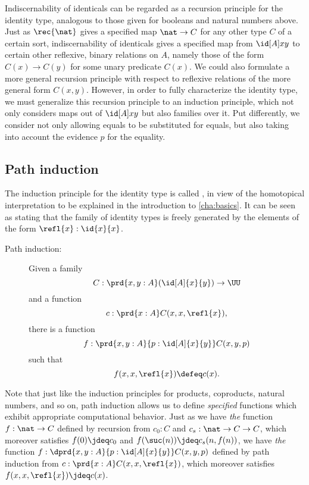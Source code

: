 Indiscernability of identicals can be regarded as a recursion principle for the identity type, analogous to those given for booleans and natural numbers above.
Just as $\rec{\nat}$ gives a specified map $\nat\to C$ for any other type $C$ of a certain sort, indiscernability of identicals gives a specified map from $\id[A] x y$ to certain other reflexive, binary relations on $A$, namely those of the form $C(x) \to C(y)$ for some unary predicate $C(x)$.
We could also formulate a more general recursion principle with respect to reflexive relations of the more general form $C(x,y)$.
However, in order to fully characterize the identity type, we must generalize this recursion principle to an induction principle, which not only considers maps out of $\id[A] x y$ but also families over it.
Put differently, we consider not only allowing equals to be substituted for equals, but also taking into account the evidence $p$ for the equality.
    
\subsection{Path induction}

The induction principle for the identity type is called ,
%
%
in view of the homotopical interpretation to be explained in  the introduction to \cref{cha:basics}.  It can be seen as stating that the family of identity types is freely generated by the elements of the form $\refl{x}: \id{x}{x}$.

\begin{description}
\item[Path induction:] 
  Given a family 
  \[ C : \prd{x,y:A} (\id[A]{x}{y}) \to \UU \]
  and a function
  \[ c :  \prd{x:A} C(x,x,\refl{x}),\]
  there is a function
  \[ f : \prd{x,y:A}{p:\id[A]{x}{y}} C(x,y,p) \]
  such that 
  \[ f(x,x,\refl{x}) \defeq c(x). \]
\end{description}

Note that just like the induction principles for products, coproducts, natural numbers, and so on, path induction allows us to define \emph{specified} functions which exhibit appropriate computational behavior.
Just as we have \emph{the} function $f:\nat\to C$ defined by recursion from $c_0:C$ and $c_s:\nat \to C \to C$, which moreover satisfies $f(0)\jdeq c_0$ and $f(\suc(n))\jdeq c_s(n,f(n))$, we have \emph{the} function $f : \dprd{x,y:A}{p:\id[A]{x}{y}} C(x,y,p)$ defined by path induction from $c :  \prd{x:A} C(x,x,\refl{x})$, which moreover satisfies $f(x,x,\refl{x}) \jdeq c(x)$.


